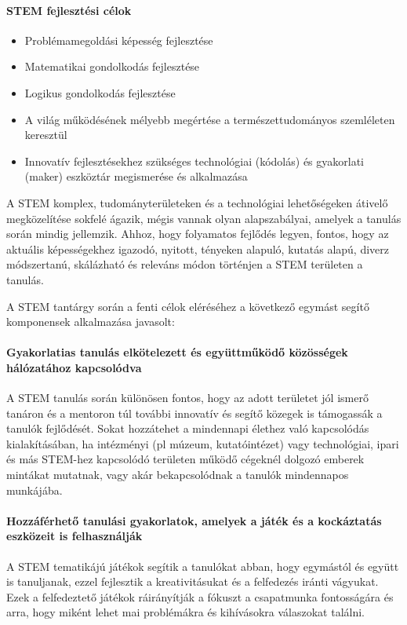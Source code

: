 \paragraph{STEM fejlesztési célok}
\begin{itemize}
\item Problémamegoldási képesség fejlesztése
\item  Matematikai gondolkodás fejlesztése
\item  Logikus gondolkodás fejlesztése
\item  A világ működésének mélyebb megértése a természettudományos szemléleten keresztül
\item  Innovatív fejlesztésekhez szükséges technológiai (kódolás) és gyakorlati (maker) eszköztár megismerése és alkalmazása
\end{itemize}

A STEM komplex, tudományterületeken és a technológiai lehetőségeken átivelő megközelítése sokfelé ágazik, mégis vannak olyan alapszabályai, amelyek a tanulás során mindig jellemzik. Ahhoz, hogy folyamatos fejlődés legyen, fontos, hogy az aktuális képességekhez igazodó, nyitott, tényeken alapuló, kutatás alapú, diverz módszertanú, skálázható és releváns módon történjen a STEM területen a tanulás.

A STEM tantárgy során a fenti célok eléréséhez a következő egymást segítő komponensek alkalmazása javasolt:


\paragraph{Gyakorlatias tanulás elkötelezett és együttműködő közösségek hálózatához kapcsolódva}
A STEM tanulás során különösen fontos, hogy az adott területet jól ismerő tanáron és a mentoron túl további innovatív és segítő közegek is támogassák a tanulók fejlődését. Sokat hozzátehet a mindennapi élethez való kapcsolódás kialakításában, ha intézményi (pl múzeum, kutatóintézet) vagy technológiai, ipari és más STEM-hez kapcsolódó területen működő cégeknél dolgozó emberek mintákat mutatnak, vagy akár bekapcsolódnak a tanulók mindennapos munkájába.

\paragraph{Hozzáférhető tanulási gyakorlatok, amelyek a játék és a kockáztatás eszközeit is felhasználják} A STEM tematikájú játékok segítik a tanulókat abban, hogy egymástól és együtt is tanuljanak, ezzel fejlesztik a kreativitásukat és a felfedezés iránti vágyukat. Ezek a felfedeztető játékok ráirányítják a fókuszt a csapatmunka fontosságára és arra, hogy miként lehet mai problémákra és kihívásokra válaszokat találni.

